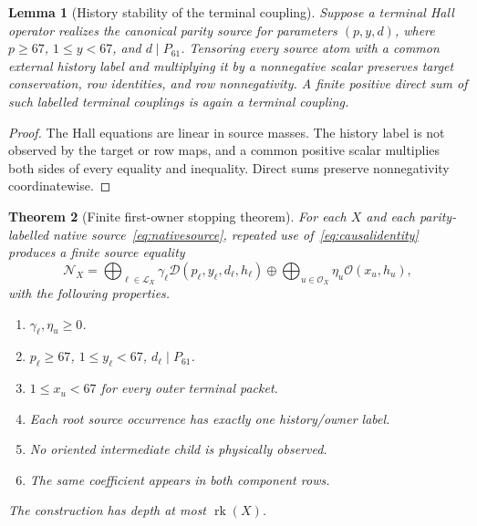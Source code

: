 \documentclass[11pt]{article}
\newtheorem{theorem}{Theorem}[section]
\newtheorem{lemma}[theorem]{Lemma}
\newcommand{\Native}{\mathscr N}
\newcommand{\rk}{\operatorname{rk}}
\begin{document}
\begin{lemma}[History stability of the terminal coupling]
\label{lem:history}
Suppose a terminal Hall operator realizes the canonical parity source for parameters $(p,y,d)$, where $p\ge67$, $1\le y<67$, and $d\mid P_{61}$.  Tensoring every source atom with a common external history label and multiplying it by a nonnegative scalar preserves target conservation, row identities, and row nonnegativity.  A finite positive direct sum of such labelled terminal couplings is again a terminal coupling.
\end{lemma}
\begin{proof}
The Hall equations are linear in source masses.  The history label is not observed by the target or row maps, and a common positive scalar multiplies both sides of every equality and inequality.  Direct sums preserve nonnegativity coordinatewise.
\end{proof}

\begin{theorem}[Finite first-owner stopping theorem]
\label{thm:stopping}
For each $X$ and each parity-labelled native source~\eqref{eq:nativesource}, repeated use of~\eqref{eq:causalidentity} produces a finite source equality
\begin{equation}
 \Native_X=\bigoplus_{\ell\in\mathcal L_X}
 \gamma_\ell\mathscr D(p_\ell,y_\ell,d_\ell,h_\ell)
 \oplus
 \bigoplus_{u\in\mathcal O_X}\eta_u\mathscr O(x_u,h_u),
\label{eq:stoppingline}
\end{equation}
with the following properties.
\begin{enumerate}[label=(\roman*)]
\item $\gamma_\ell,\eta_u\ge0$.
\item $p_\ell\ge67$, $1\le y_\ell<67$, $d_\ell\mid P_{61}$.
\item $1\le x_u<67$ for every outer terminal packet.
\item Each root source occurrence has exactly one history/owner label.
\item No oriented intermediate child is physically observed.
\item The same coefficient appears in both component rows.
\end{enumerate}
The construction has depth at most $\rk(X)$.
\end{theorem}
\end{document}
